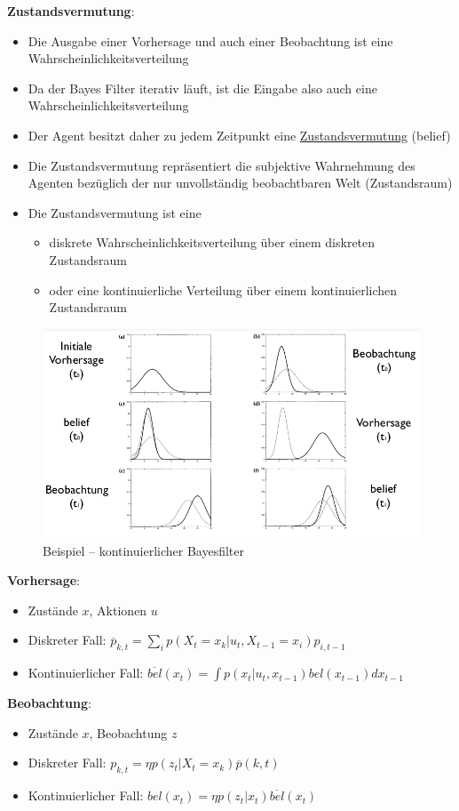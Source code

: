 \textbf{Zustandsvermutung}:
\begin{itemize}
	\item Die Ausgabe einer Vorhersage und auch einer Beobachtung ist eine Wahrscheinlichkeitsverteilung
	\item Da der Bayes Filter iterativ l\"auft, ist die Eingabe also auch eine Wahrscheinlichkeitsverteilung
	\item Der Agent besitzt daher zu jedem Zeitpunkt eine \underline{Zustandsvermutung} (belief)
	\item Die Zustandsvermutung repr\"asentiert die subjektive Wahrnehmung des Agenten bez\"uglich der nur unvollst\"andig beobachtbaren Welt (Zustandsraum)
	\item Die Zustandsvermutung ist eine
	\begin{itemize}
		\item diskrete Wahrscheinlichkeitsverteilung \"uber einem diskreten Zustandsraum
		\item oder eine kontinuierliche Verteilung \"uber einem kontinuierlichen Zustandsraum
	\end{itemize}
\end{itemize}
\begin{figure}[!h]
	\centering
  	\includegraphics[width=0.8\linewidth]{figures/ch08_kont-bayes.png}
  	\centering
	\caption{Beispiel -- kontinuierlicher Bayesfilter}
	\label{kont-bayes}
\end{figure}
\textbf{Vorhersage}:
\begin{itemize}
	\item Zust\"ande $x$, Aktionen $u$
	\item Diskreter Fall: $\overline{p}_{k,t} = \sum_i p(X_t = x_k | u_t, X_{t-1} = x_i)p_{i, t-1}$
	\item Kontinuierlicher Fall: $\overline{bel}(x_t) = \int p(x_t | u_t, x_{t-1}) bel(x_{t-1})dx_{t-1}$
\end{itemize}

\textbf{Beobachtung}:
\begin{itemize}
	\item Zust\"ande $x$, Beobachtung $z$
	\item Diskreter Fall: $p_{k,t} = \eta p(z_t | X_t = x_k) \overline{p}(k,t)$
	\item Kontinuierlicher Fall: $bel(x_t) = \eta p(z_t | x_t) \overline{bel}(x_t)$
\end{itemize}


